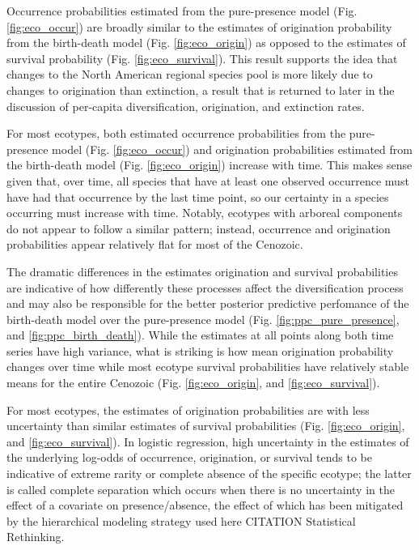 \documentclass[12pt,letterpaper]{article}
\begin{document}
Occurrence probabilities estimated from the pure-presence model (Fig. \ref{fig:eco_occur}) are broadly similar to the estimates of origination probability from the birth-death model (Fig. \ref{fig:eco_origin}) as opposed to the estimates of survival probability (Fig. \ref{fig:eco_survival}). This result supports the idea that changes to the North American regional species pool is more likely due to changes to origination than extinction, a result that is returned to later in the discussion of per-capita diversification, origination, and extinction rates.

For most ecotypes, both estimated occurrence probabilities from the pure-presence model (Fig. \ref{fig:eco_occur}) and origination probabilities estimated from the birth-death model (Fig. \ref{fig:eco_origin}) increase with time. This makes sense given that, over time, all species that have at least one observed occurrence must have had that occurrence by the last time point, so our certainty in a species occurring must increase with time. Notably, ecotypes with arboreal components do not appear to follow a similar pattern; instead, occurrence and origination probabilities appear relatively flat for most of the Cenozoic.

The dramatic differences in the estimates origination and survival probabilities are indicative of how differently these processes affect the diversification process and may also be responsible for the better posterior predictive perfomance of the birth-death model over the pure-presence model (Fig. \ref{fig:ppc_pure_presence}, and \ref{fig:ppc_birth_death}). While the estimates at all points along both time series have high variance, what is striking is how mean origination probability changes over time while most ecotype survival probabilities have relatively stable means for the entire Cenozoic (Fig. \ref{fig:eco_origin}, and \ref{fig:eco_survival}).

For most ecotypes, the estimates of origination probabilities are with less uncertainty than similar estimates of survival probabilities (Fig. \ref{fig:eco_origin}, and \ref{fig:eco_survival}). In logistic regression, high uncertainty in the estimates of the underlying log-odds of occurrence, origination, or survival tends to be indicative of extreme rarity or complete absence of the specific ecotype; the latter is called complete separation which occurs when there is no uncertainty in the effect of a covariate on presence/absence, the effect of which has been mitigated by the hierarchical modeling strategy used here \citep{Gelman2013d,Gelman2007} CITATION Statistical Rethinking.
\end{document}
